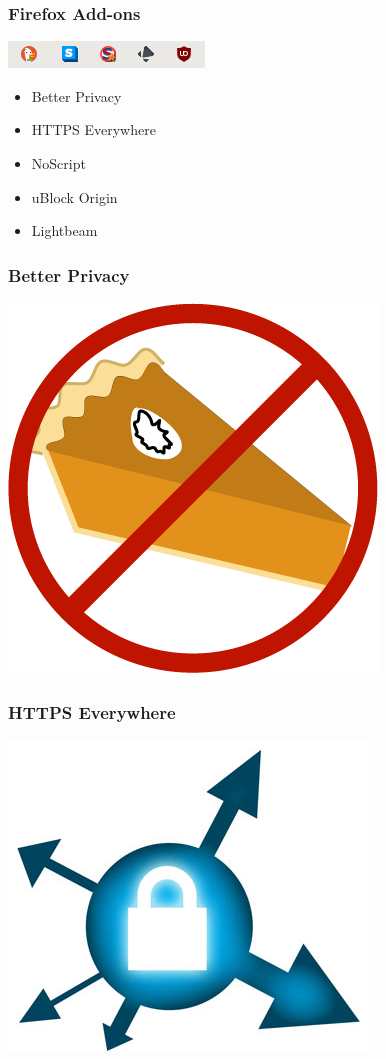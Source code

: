 
  \begin{frame}
    \frametitle{Firefox Add-ons}
    \includegraphics{../../img/plugins.png}
    \begin{itemize}
      \item Better Privacy
      \item HTTPS Everywhere
      \item NoScript
      \item uBlock Origin
      \item Lightbeam
    \end{itemize}
  \end{frame}

  \begin{frame}
    \frametitle{Better Privacy}
    \includegraphics[height=0.7\textheight]{../../img/better_privacy.png}
  \end{frame}

  \begin{frame}
    \frametitle{HTTPS Everywhere}
    \includegraphics[height=0.7\textheight]{../../img/https_everywhere.png}
  \end{frame}

